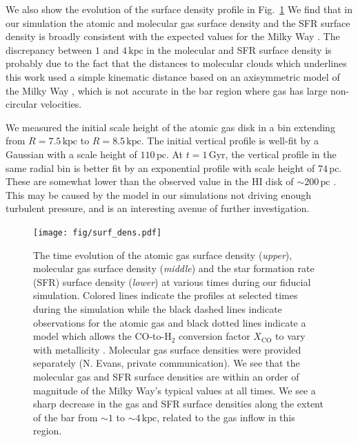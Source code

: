 \begin{appendices}
We also show the evolution of the surface density profile in Fig.~\ref{fig:surf}
We find that in our simulation the atomic and molecular gas surface density and
the SFR surface density is broadly consistent with the expected values for the
Milky Way \citep{2008A&A...487..951K,2022ApJ...929L..18E}. The discrepancy between
$1$ and $4\,\textrm{kpc}$ in the molecular and SFR surface density is probably due
to the fact that the distances to molecular clouds which underlines this work
used a simple kinematic distance based on an axisymmetric model of the Milky
Way \citep{2017ApJ...834...57M}, which is not accurate in the bar region where gas
has large non-circular velocities.

We measured the initial scale height of the atomic gas disk in a bin
extending from $R=7.5\,\textrm{kpc}$ to $R=8.5\,\textrm{kpc}$. The initial
vertical profile is well-fit by a Gaussian with a scale height of
$110\,\textrm{pc}$. At $t=1\,\textrm{Gyr}$, the vertical profile in the same
radial bin is better fit by an exponential profile with scale height of
$74\,\textrm{pc}$. These are somewhat lower than the observed value in the HI
disk of $\sim200\,\textrm{pc}$ \citep{1995ApJ...448..138M, 2017A&A...607A.106M}.
This may be caused by the model in our simulations not driving enough turbulent
pressure, and is an interesting avenue of further investigation.

\begin{figure}
    \centering
    \texttt{[image: fig/surf\_dens.pdf]}
    \caption{The time evolution of the atomic gas surface density
    (\textit{upper}), molecular gas surface density (\textit{middle}) and the
    star formation rate (SFR) surface density (\textit{lower}) at various times
    during our fiducial simulation. Colored lines indicate the profiles at
    selected times during the simulation while the black dashed lines indicate
    observations for the atomic gas \citep{2008A&A...487..951K} and black dotted
    lines indicate a model which allows the CO-to-H$_2$ conversion factor
    $X_{\textrm{CO}}$ to vary with metallicity \citep{2022ApJ...929L..18E}.
    Molecular gas surface densities were provided separately (N. Evans, private
    communication). We see that the molecular gas and SFR surface densities are
    within an order of magnitude of the Milky Way's typical values at all times.
    We see a sharp decrease in the gas and SFR surface densities along the
    extent of the bar from $\sim1$ to $\sim4\,\textrm{kpc}$, related to the gas
    inflow in this region.}
    \label{fig:surf}
\end{figure}


\end{appendices}
